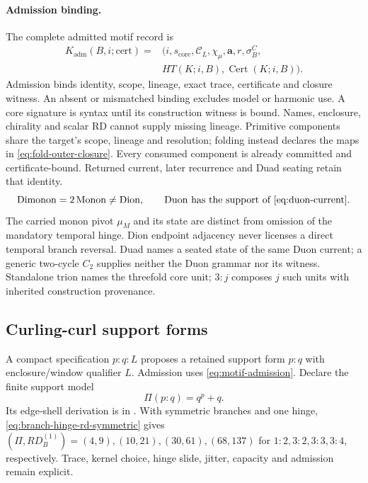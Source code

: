 \paragraph{Admission binding.}
The complete admitted motif record is
\begin{equation}
\begin{split}
K_{\mathrm{adm}}(B,i;\mathrm{cert})={}&
(i,s_{\mathrm{core}},\mathcal C_L,\chi_\mu,\mathbf a,r,\sigma^C_B,\\
&HT(K;i,B),\operatorname{Cert}(K;i,B)).
\end{split}
\label{eq:motif-admission}
\end{equation}
Admission binds identity, scope, lineage, exact trace, certificate and closure
witness. An absent or mismatched binding excludes model or harmonic use. A core signature is syntax until its construction witness is bound.
Names, enclosure, chirality and scalar RD cannot supply missing lineage. Primitive components share the target's scope, lineage and
resolution; folding instead declares the maps in \eqref{eq:fold-outer-closure}.
Every consumed component is already committed and certificate-bound. Returned
current, later recurrence and Duad seating retain that identity.
\begin{equation}
\mathrm{Dimonon}=2\,\mathrm{Monon}\ne\mathrm{Dion},\qquad
\mathrm{Duon}\ \text{has the support of }\eqref{eq:duon-current}.
\label{eq:motif-grammar}
\end{equation}
The carried monon pivot \(\mu_M\) and its state are distinct from omission of
the mandatory temporal hinge. Dion endpoint adjacency never licenses a direct
temporal branch reversal. Duad names a seated state of the same Duon current;
a generic two-cycle \(C_2\) supplies neither the Duon grammar nor its witness.
Standalone trion names the threefold core unit; \(3:j\) composes \(j\) such
units with inherited construction provenance.

\subsection{Curling-curl support forms}\label{subsec:curling-curl-support-forms}

A compact specification \(p{:}q{:}L\) proposes a retained support form
\(p{:}q\) with enclosure/window qualifier \(L\). Admission uses
\eqref{eq:motif-admission}. Declare the finite support model
\begin{equation}
\Pi(p{:}q)=q^p+q.
\label{eq:curling-support-model}
\end{equation}
Its edge-shell derivation is in .
With symmetric branches and one hinge, \eqref{eq:branch-hinge-rd-symmetric} gives
\((\Pi,RD_B^{(1)})=(4,9),(10,21),(30,61),(68,137)\) for
\(1{:}2,3{:}2,3{:}3,3{:}4\), respectively. Trace, kernel choice, hinge slide,
jitter, capacity and admission remain explicit.


